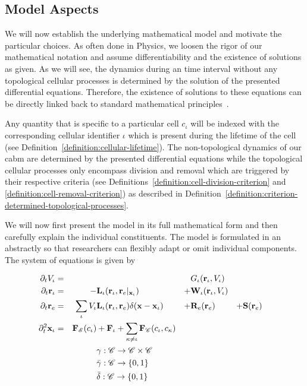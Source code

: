 \subsection{Model Aspects}
We will now establish the underlying mathematical model and motivate the particular choices.
As often done in Physics, we loosen the rigor of our mathematical notation and assume
differentiability and the existence of solutions as given.
As we will see, the dynamics during an time interval without any topological cellular processes is
determined by the solution of the presented differential equations.
Therefore, the existence of solutions to these equations can be directly linked back to standard
mathematical principles~\cite{Polyanin2001,Polyanin2017}.

Any quantity that is specific to a particular cell $c_\iota$ will be indexed with the corresponding
cellular identifier $\iota$ which is present during the lifetime of the cell (see
Definition~\ref{definition:cellular-lifetime}).
The non-topological dynamics of our \ac{cabm} are determined by the presented differential equations
while the topological cellular processes only encompass division and removal which are triggered by
their respective criteria (see Definitions~\ref{definition:cell-division-criterion} and
\ref{definition:cell-removal-criterion}) as described in
Definition~\ref{definition:criterion-determined-topological-processes}.

We will now first present the model in its full mathematical form and then carefully explain the
individual constituents.
The model is formulated in an abstractly so that researchers can flexibly adapt or omit individual
components.
The system of equations is given by

\begin{alignat}{5}
    \partial_t{V_\iota} &= &&&&G_\iota(\mathbf{r}_\iota, V_\iota)
    \label{eq:volumetric-growth}\\
    \partial_t{\mathbf{r}_\iota} &=  &-&
    \mathbf{L}_\iota(\mathbf{r}_\iota,\mathbf{r}_e|_{\mathbf{x}_\iota}) &+&
    \mathbf{W}_\iota(\mathbf{r}_\iota, V_\iota)
    \label{eq:intracellular-reactions}\\
    \partial_t{\mathbf{r}_e} &= &\sum\limits_\iota V_\iota
        &\mathbf{L}_\iota(\mathbf{r}_\iota,\mathbf{r}_e)\delta(\mathbf{x}-\mathbf{x}_\iota) &+&
        \mathbf{R}_e(\mathbf{r}_e) &+& \mathbf{S}(\mathbf{r}_e)
    \label{eq:extracellular-reactions}\\
    \partial^2_t\mathbf{x}_\iota &= &\mathbf{F}_{\mathscr{E}}(c_\iota)& +
    \mathbf{F}_\iota + \sum\limits_{\kappa\neq \iota}\mathbf{F}_{\mathscr{C}}(c_\iota,c_\kappa)
    \label{eq:equations-of-motion-2}\\
    &&&\gamma:\mathscr{C}\rightarrow\mathscr{C}\times\mathscr{C}\\
    &&&\bar{\gamma}:\mathscr{C}\rightarrow\{0,1\}\\
    &&&\bar{\delta}:\mathscr{C}\rightarrow\{0,1\}
\end{alignat}

